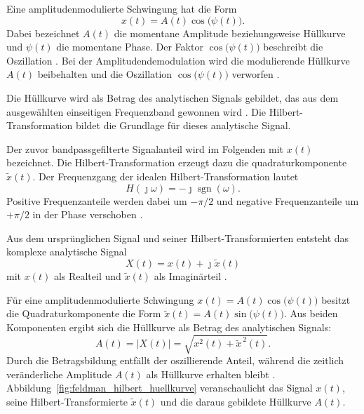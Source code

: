 Eine amplitudenmodulierte Schwingung hat die Form
\begin{equation}
    x(t) = A(t)\cos\bigl(\psi(t)\bigr).
    \label{eq:amplitude_modulation}
\end{equation}
Dabei bezeichnet $A(t)$ die momentane Amplitude beziehungsweise
Hüllkurve und $\psi(t)$ die momentane Phase.
Der Faktor $\cos\bigl(\psi(t)\bigr)$ beschreibt die Oszillation
\cite[S.~741, Abschn.~3.1, Gl.~(5)--(7)]
{feldmanHilbertTransformVibration2011}. Bei der Amplitudendemodulation wird
die modulierende Hüllkurve $A(t)$ beibehalten und die Oszillation
$\cos\bigl(\psi(t)\bigr)$ verworfen
\cite[S.~746, Abschn.~5.1, erster Absatz]
{feldmanHilbertTransformVibration2011}.

Die Hüllkurve wird als
Betrag des analytischen Signals gebildet, das aus dem ausgewählten
einseitigen Frequenzband gewonnen wird
\cite[S.~507, Abschn.~5, Abb.~25 und letzter Absatz]
{randallRollingElementBearing2011a}.
Die Hilbert-Transformation bildet die Grundlage für dieses analytische Signal.


Der zuvor bandpassgefilterte Signalanteil wird im Folgenden mit $x(t)$
bezeichnet. Die Hilbert-Transformation erzeugt dazu die
\hypertarget{begriff:quadraturkomponente}{\gls{quadraturkomponente}}
$\widetilde{x}(t)$. Der Frequenzgang der idealen Hilbert-Transformation lautet
\begin{equation}
    H(\jmath\omega) = -\jmath\operatorname{sgn}(\omega).
    \label{eq:hilbert_frequency_response}
\end{equation}
Positive Frequenzanteile werden dabei um $-\pi/2$ und negative Frequenzanteile
um $+\pi/2$ in der Phase verschoben
\cite[S.~747, Abschn.~6]{feldmanHilbertTransformVibration2011}.

Aus dem ursprünglichen Signal und seiner Hilbert-Transformierten entsteht das komplexe
analytische Signal
\begin{equation}
    X(t) = x(t) + \jmath\widetilde{x}(t)
    \label{eq:analytic_signal}
\end{equation}
mit $x(t)$ als Realteil und $\widetilde{x}(t)$ als Imaginärteil
\cite[S.~740, Abschn.~3, Gl.~(4)]
{feldmanHilbertTransformVibration2011}.

Für eine amplitudenmodulierte Schwingung
$x(t)=A(t)\cos\bigl(\psi(t)\bigr)$ besitzt die Quadraturkomponente die Form
$\widetilde{x}(t)=A(t)\sin\bigl(\psi(t)\bigr)$. Aus beiden
Komponenten ergibt sich die Hüllkurve als Betrag des analytischen Signals:
\begin{equation}
    A(t) = \lvert X(t) \rvert
         = \sqrt{x^2(t) + \widetilde{x}^{\,2}(t)}.
    \label{eq:envelope}
\end{equation}
Durch die Betragsbildung entfällt der oszillierende Anteil, während die zeitlich
veränderliche Amplitude $A(t)$ als Hüllkurve erhalten bleibt
\cite[S.~741, Abschn.~3.1, Gl.~(5)--(6);
S.~746, Abschn.~5.1]{feldmanHilbertTransformVibration2011}.
Abbildung~\ref{fig:feldman_hilbert_huellkurve} veranschaulicht das Signal
$x(t)$, seine Hilbert-Transformierte $\widetilde{x}(t)$ und die daraus
gebildete Hüllkurve $A(t)$.

